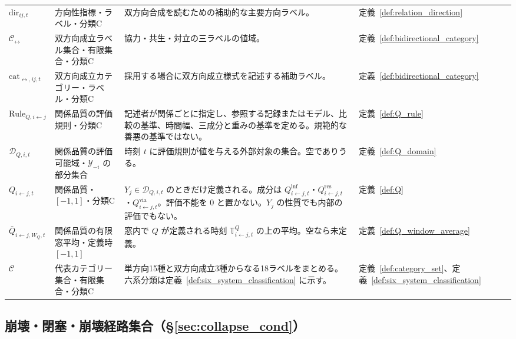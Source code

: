 \begin{longtable}{p{3.0cm} p{3.0cm} p{6.6cm} p{2.0cm}}
$\mathrm{dir}_{ij,t}$ & 方向性指標・ラベル・分類C &
双方向合成を読むための補助的な主要方向ラベル。 &
定義~\ref{def:relation_direction} \\[3pt]
$\mathcal C_{\leftrightarrow}$ & 双方向成立ラベル集合・有限集合・分類C &
協力・共生・対立の三ラベルの値域。 &
定義~\ref{def:bidirectional_category} \\[3pt]
$\mathrm{cat}_{\leftrightarrow,ij,t}$ & 双方向成立カテゴリー・ラベル・分類C &
採用する場合に双方向成立様式を記述する補助ラベル。 &
定義~\ref{def:bidirectional_category} \\[3pt]
$\mathrm{Rule}_{Q,i\leftarrow j}$ & 関係品質の評価規則・分類C &
記述者が関係ごとに指定し、参照する記録またはモデル、比較の基準、時間幅、三成分と重みの基準を定める。規範的な善悪の基準ではない。 &
定義~\ref{def:Q_rule} \\[3pt]
$\mathcal D_{Q,i,t}$ & 関係品質の評価可能域・$\mathcal Y_{-i}$ の部分集合 &
時刻 $t$ に評価規則が値を与える外部対象の集合。空でありうる。 &
定義~\ref{def:Q_domain} \\[3pt]
$Q_{i\leftarrow j,t}$ & 関係品質・$[-1,1]$・分類C &
$Y_j\in\mathcal D_{Q,i,t}$ のときだけ定義される。成分は $Q^{\mathrm{inf}}_{i\leftarrow j,t}$・$Q^{\mathrm{res}}_{i\leftarrow j,t}$・$Q^{\mathrm{via}}_{i\leftarrow j,t}$。評価不能を $0$ と置かない。$Y_j$ の性質でも内部の評価でもない。 &
定義~\ref{def:Q} \\[3pt]
$\bar Q_{i\leftarrow j,W_Q,t}$ & 関係品質の有限窓平均・定義時 $[-1,1]$ &
窓内で $Q$ が定義される時刻 $\mathbb T^{Q}_{i\leftarrow j,t}$ の上の平均。空なら未定義。 &
定義~\ref{def:Q_window_average} \\[3pt]
$\mathcal C$ & 代表カテゴリー集合・有限集合・分類C &
単方向15種と双方向成立3種からなる18ラベルをまとめる。六系分類は定義~\ref{def:six_system_classification} に示す。 &
定義~\ref{def:category_set}、定義~\ref{def:six_system_classification} \\[3pt]
\end{longtable}
\endgroup

\subsection{崩壊・閉塞・崩壊経路集合（\S\ref{sec:collapse_cond}）}
\label{app:symbols_s7}


